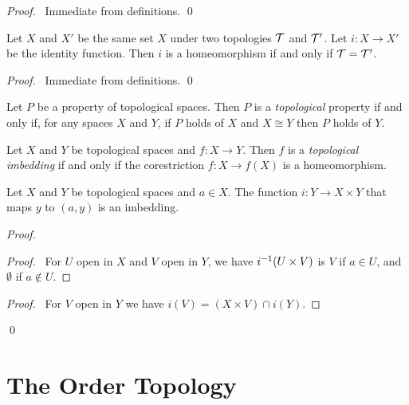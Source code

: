 \begin{proof}
    \pf\ Immediate from definitions. \qed
\end{proof}

\begin{proposition}
    Let $X$ and $X'$ be the same set $X$ under two topologies $\mathcal{T}$ and $\mathcal{T}'$. Let $i : X \rightarrow X'$
    be the identity function. Then $i$ is a homeomorphism if and only if $\mathcal{T} = \mathcal{T}'$.
\end{proposition}

\begin{proof}
    \pf\ Immediate from definitions. \qed
\end{proof}

\begin{definition}
    Let $P$ be a property of topological spaces. Then $P$ is a \emph{topological} property if and only if,
    for any spaces $X$ and $Y$, if $P$ holds of $X$ and $X \cong Y$ then $P$ holds of $Y$.
\end{definition}

\begin{definition}
    Let $X$ and $Y$ be topological spaces and $f : X \rightarrow Y$. Then $f$ is a \emph{topological
    imbedding} if and only if the corestriction $f : X \rightarrow f(X)$ is a homeomorphism.
\end{definition}

\begin{proposition}
    \label{proposition:imbedding_product}
    Let $X$ and $Y$ be topological spaces and $a \in X$. The function $i : Y \rightarrow X \times Y$ that maps $y$ to $(a,y)$ is an imbedding.
\end{proposition}

\begin{proof}
    \pf
    \begin{proof}
        \pf\ For $U$ open in $X$ and $V$ open in $Y$, we have ${i}^{-1}(U \times V)$ is $V$ if $a \in U$, and $\emptyset$ if $a \notin U$.
    \end{proof}
    \begin{proof}
        \pf\ For $V$ open in $Y$ we have $i(V) = (X \times V) \cap i(Y)$.
    \end{proof}
    \qed
\end{proof}

\section{The Order Topology}

